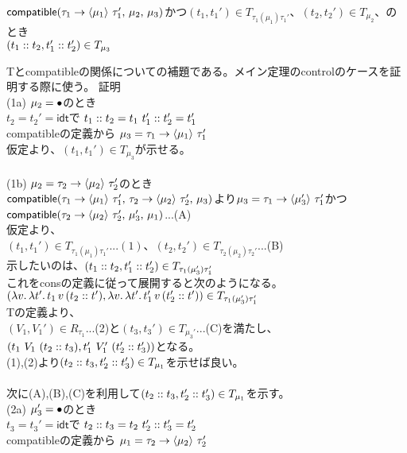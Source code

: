 \begin{lemma}
  $\Compatible{\Trail{\tau_1}{\tau_1'}{\mu_1}}{\mu_2}{\mu_3}$かつ$(t_1, t_1')\in T_{\tau_1(\mu_1)\tau_1'}、(t_2, t_2')\in T_{\mu_2}、$のとき\\
  $(\Cons{t_1}{t_2}, \Cons{t_1'}{t_2'})\in T_{\mu_3}$
\end{lemma}
Tと\textsf{compatible}の関係についての補題である。メイン定理の\textsf{control}のケースを証明する際に使う。
\lbrack 証明 \rbrack\\
(1a) $\mu_2=\Bullet$のとき\\
$t_2=t_2'=\textsf{idt}$で $\Cons{t_1}{t_2}=t_1\ \Cons{t_1'}{t_2'}=t_1'$\\
\textsf{compatible}の定義から $\mu_3 = \Trail{\tau_1}{\tau_1'}{\mu_1}$\\
仮定より、$(t_1,t_1')\in T_{\mu_3}$が示せる。\\
\\
(1b) $\mu_2=\Trail{\tau_2}{\tau_2'}{\mu_2}$のとき\\
$\Compatible{\Trail{\tau_1}{\tau_1'}{\mu_1}}{\Trail{\tau_2}{\tau_2'}{\mu_2}}{\mu_3}$より$\mu_3 = \Trail{\tau_1}{\tau_1'}{\mu_3'}$かつ$\Compatible{\Trail{\tau_2}{\tau_2'}{\mu_2}}{\mu_3'}{\mu_1}$...(A)\\
仮定より、\\
$(t_1, t_1')\in T_{\tau_1(\mu_1)\tau_1'}...(1)、(t_2, t_2')\in T_{\tau_2(\mu_2)\tau_2'}$...(B)\\
示したいのは、$(\Cons{t_1}{t_2}, \Cons{t_1'}{t_2'})\in T_{\tau_1(\mu_3')\tau_1'}$\\これを\textsf{cons}の定義に従って展開すると次のようになる。\\
$(\Lam{v}{\Lam{t'}{t_1\,v\,(\Cons{t_2}{t'})}}, \Lam{v}{\Lam{t'}{t_1'\,v\,(\Cons{t_2'}{t'})}})\in T_{\tau_1(\mu_3')\tau_1'}$\\
Tの定義より、\\
$(V_1,V_1')\in R_{\tau_1}$...(2)と$(t_3,t_3')\in T_{\mu_3'}$...(C)を満たし、$(t_1\ V_1\ (\Cons{t_2}{t_3}),t_1'\ V_1'\ (\Cons{t_2'}{t_3'}))$となる。\\
(1),(2)より$(\Cons{t_2}{t_3},\Cons{t_2'}{t_3'})\in T_{\mu_1}$を示せば良い。\\
\\
次に(A),(B),(C)を利用して$(\Cons{t_2}{t_3},\Cons{t_2'}{t_3'})\in T_{\mu_1}$を示す。\\
(2a) $\mu_3'=\Bullet$のとき\\
$t_3=t_3'=\textsf{idt}$で $\Cons{t_2}{t_3}=t_2\ \Cons{t_2'}{t_3'}=t_2'$\\
\textsf{compatible}の定義から $\mu_1 = \Trail{\tau_2}{\tau_2'}{\mu_2}$\\
